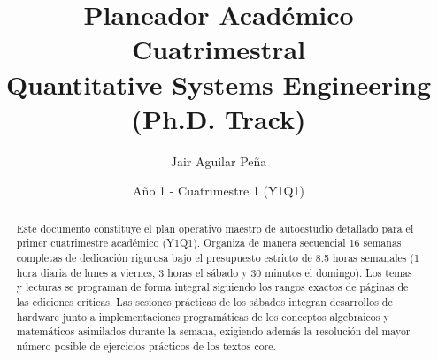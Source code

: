 \documentclass[11pt, a4paper]{article}
\title{\textbf{\color{primary}Planeador Académico Cuatrimestral\\ \large Quantitative Systems Engineering (Ph.D. Track)}}
\author{Jair Aguilar Peña}
\date{Año 1 - Cuatrimestre 1 (Y1Q1)}
\begin{document}

\maketitle

\begin{abstract}
Este documento constituye el plan operativo maestro de autoestudio detallado para el primer cuatrimestre académico (Y1Q1). Organiza de manera secuencial 16 semanas completas de dedicación rigurosa bajo el presupuesto estricto de 8.5 horas semanales (1 hora diaria de lunes a viernes, 3 horas el sábado y 30 minutos el domingo). Los temas y lecturas se programan de forma integral siguiendo los rangos exactos de páginas de las ediciones críticas. Las sesiones prácticas de los sábados integran desarrollos de hardware junto a implementaciones programáticas de los conceptos algebraicos y matemáticos asimilados durante la semana, exigiendo además la resolución del mayor número posible de ejercicios prácticos de los textos core.
\end{abstract}

\tableofcontents
\newpage
\end{document}
